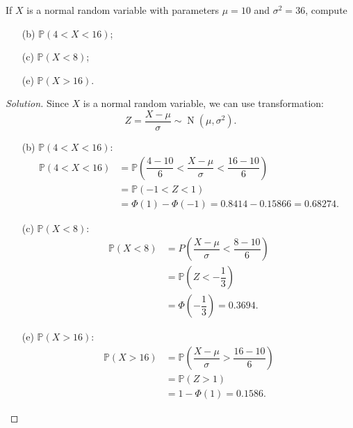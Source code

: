 \documentclass{article}[12pt]
\newenvironment{solution}
  {\renewcommand\qedsymbol{$\blacksquare$}\begin{proof}[Solution]}
  {\end{proof}}
\newenvironment{problem}[1]
  {\renewcommand\theinnercustomprblm{#1}\innercustomprblm}
  {\endinnercustomprblm}
\DeclareMathOperator{\Norm}{N}
\renewcommand{\P}{\mathbb{P}}
\begin{document}
\newpage
\begin{problem}{5.15(b, c, e)}\normalfont
If $X$ is a normal random variable with parameters $\mu = 10$ and $\sigma^{2} = 36$, compute
\begin{enumerate}%
    \item[(b)] $\P(4 < X < 16)$;
    \item[(c)] $\P(X < 8)$;
    \item[(e)] $\P(X > 16)$.
\end{enumerate}
\end{problem}
\begin{solution}
Since $X$ is a normal random variable, we can use transformation:
\begin{equation*}
    Z = \dfrac{X - \mu}{\sigma}\sim\Norm\left(\mu, \sigma^{2}\right).
\end{equation*}
\begin{enumerate}
    \item[(b)] $\P(4 < X < 16)$:
    \begin{align*}
        \P(4 < X < 16) &= \P\left(\dfrac{4 - 10}{6} < \dfrac{X - \mu}{\sigma} < \dfrac{16 - 10}{6} \right)
        \\
        &=\P(-1 < Z < 1)
        \\
        &=\Phi(1) - \Phi(-1) = 0.8414 - 0.15866 = 0.68274.
    \end{align*}

    \item[(c)] $\P(X < 8)$:
    \begin{align*}
        \P(X < 8) &= P\left(\dfrac{X -\mu}{\sigma} < \dfrac{8 - 10}{6}\right)
        \\
        &=\P\left(Z < -\dfrac{1}{3}\right)
        \\
        &=\Phi\left(-\dfrac{1}{3}\right) = 0.3694.
    \end{align*}

    \item[(e)] $\P(X > 16)$:
    \begin{align*}
        \P(X > 16) &= \P\left(\dfrac{X -\mu}{\sigma} > \dfrac{16 - 10}{6}\right)
        \\
        &=\P(Z > 1)
        \\
        &=1 - \Phi(1) = 0.1586.
    \end{align*}
\end{enumerate}
\end{solution}
\end{document}
